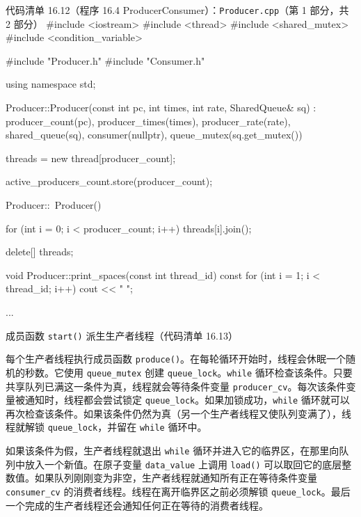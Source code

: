 \begin{codeboxt}{代码清单 16.12（程序 16.4 ProducerConsumer）：\texttt{Producer.\allowbreak{}cpp}（第 1 部分，共 2 部分）}
#include <iostream>
#include <thread>
#include <shared_mutex>
#include <condition_variable>

#include "Producer.h"
#include "Consumer.h"

using namespace std;

Producer::Producer(const int pc, int times, int rate,
                   SharedQueue& sq)
    : producer_count(pc), producer_times(times), producer_rate(rate),
      shared_queue(sq), consumer(nullptr),
      queue_mutex(sq.get_mutex())
{
    threads = new thread[producer_count];

    active_producers_count.store(producer_count);
}
Producer::~Producer()
{
    for (int i = 0; i < producer_count; i++)
    {
        threads[i].join();
    }

    delete[] threads;
}

void Producer::print_spaces(const int thread_id) const
{
    for (int i = 1; i < thread_id; i++) cout << "              ";
}

...
\end{codeboxt}

成员函数 \texttt{start()} 派生生产者线程（代码清单 16.13）

每个生产者线程执行成员函数 \texttt{produce()}。在每轮循环开始时，线程会休眠一个随机的秒数。它使用 \texttt{queue\_\allowbreak{}mutex} 创建 \texttt{queue\_\allowbreak{}lock}。\texttt{while} 循环检查该条件。只要共享队列已满这一条件为真，线程就会等待条件变量 \texttt{producer\_\allowbreak{}cv}。每次该条件变量被通知时，线程都会尝试锁定 \texttt{queue\_\allowbreak{}lock}。如果加锁成功，\texttt{while} 循环就可以再次检查该条件。如果该条件仍然为真（另一个生产者线程又使队列变满了），线程就解锁 \texttt{queue\_\allowbreak{}lock}，并留在 \texttt{while} 循环中。

如果该条件为假，生产者线程就退出 \texttt{while} 循环并进入它的临界区，在那里向队列中放入一个新值。在原子变量 \texttt{data\_\allowbreak{}value} 上调用 \texttt{load()} 可以取回它的底层整数值。如果队列刚刚变为非空，生产者线程就通知所有正在等待条件变量 \texttt{consumer\_\allowbreak{}cv} 的消费者线程。线程在离开临界区之前必须解锁 \texttt{queue\_\allowbreak{}lock}。最后一个完成的生产者线程还会通知任何正在等待的消费者线程。

